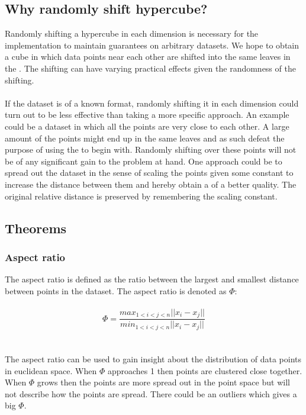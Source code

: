 \subsection{Why randomly shift hypercube?}
Randomly shifting a hypercube in each dimension is necessary for the \qs{} implementation to maintain guarantees on arbitrary datasets. We hope to obtain a cube in which data points near each other are shifted into the same leaves in the \qt{}. The shifting can have varying practical effects given the randomness of the shifting.
\\
\\
If the dataset is of a known format, randomly shifting it in each dimension could turn out to be less effective than taking a more specific approach. An example could be a dataset in which all the points are very close to each other. A large amount of the points might end up in the same leaves and as such defeat the purpose of using the \qt{} to begin with. Randomly shifting over these points will not be of any significant gain to the problem at hand. One approach could be to spread out the dataset in the sense of scaling the points given some constant to increase the distance between them and hereby obtain a \qt{} of a better quality. The original relative distance is preserved by remembering the scaling constant.

\subsection{Theorems}

\subsubsection{Aspect ratio}
The aspect ratio is defined as the ratio between the largest and smallest distance between points in the dataset\cite{wagner17}. The aspect ratio is denoted as $\Phi$:
\\
\\
$$ \Phi = \frac{max_{1<i<j<n} || x_i - x_j || }{min_{1<i<j<n} || x_i - x_j || } $$
\\
\\
The aspect ratio can be used to gain insight about the distribution of data points in euclidean space. When $\Phi$ approaches 1 then points are clustered close together. When $\Phi$ grows then the points are more spread out in the point space but will not describe how the points are spread. There could be an outliers which gives a big $\Phi$.



